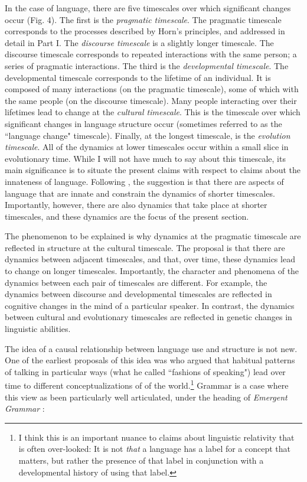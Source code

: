 \documentclass[man, noapacite, 12pt]{apa2}
\begin{document}
In the case of language,  there are five timescales over which significant changes occur (Fig. 4). The first is the {\it pragmatic timescale}. The pragmatic timescale corresponds to the processes described by Horn's principles, and addressed in detail in Part I. The {\it discourse timescale} is a slightly longer timescale. The discourse timescale corresponds to repeated interactions with the same person; a series of pragmatic interactions. The third is the {\it developmental timescale}. The developmental timescale corresponds to the lifetime of an individual. It is composed of many interactions (on the pragmatic timescale), some of which with the same people (on the discourse timescale).  Many people interacting over their lifetimes lead to change at the {\it cultural timescale}. This is the timescale over which significant changes in language structure  occur (sometimes referred to as the ``language change" timescale). Finally, at the longest timescale, is the {\it evolution timescale}. All of the dynamics at lower timescales occur within a small slice in evolutionary time. While I will not have much to say about this timescale, its main significance is to situate the present claims with respect to claims about the innateness of language. Following , the suggestion is that there are aspects of language that are innate and constrain the dynamics of shorter timescales. Importantly, however, there are also  dynamics that take place at  shorter timescales, and these dynamics are the focus of the present section.

The phenomenon to be explained is why dynamics at the pragmatic timescale are reflected in structure at the cultural timescale. The proposal is that there are dynamics between adjacent timescales, and that, over time, these dynamics lead to change on longer timescales. Importantly, the character and phenomena of the dynamics between each pair of timescales are different. For example,  the dynamics between discourse and developmental timescales are reflected in cognitive changes in the mind of a particular speaker. In contrast, the dynamics between cultural and evolutionary timescales are reflected in genetic changes in linguistic abilities.

The idea of a causal relationship between language use and structure is not new. One of the earliest proposals of this idea was  who argued that habitual patterns of talking in particular ways (what he called ``fashions of speaking") lead over time to different conceptualizations of of the world.\footnote{I think this is an important nuance to claims about linguistic relativity that is often over-looked: It is not {\it that} a language has a label for a concept that matters,  but rather the presence of that label in conjunction with a developmental history of using that label.} Grammar is a case where this view as been particularly well articulated, under the heading of {\it Emergent Grammar} \cite{hopper1987emergent}: 
\end{document}
